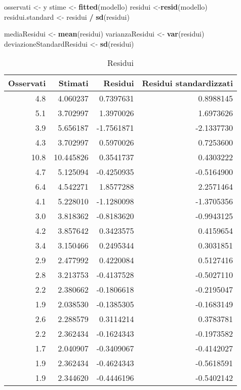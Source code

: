 \documentclass[]{book}
\newenvironment{Shaded}{\begin{snugshade}}{\end{snugshade}}
\newcommand{\KeywordTok}[1]{\textcolor[rgb]{0.13,0.29,0.53}{\textbf{#1}}}
\newcommand{\StringTok}[1]{\textcolor[rgb]{0.31,0.60,0.02}{#1}}
\newcommand{\OperatorTok}[1]{\textcolor[rgb]{0.81,0.36,0.00}{\textbf{#1}}}
\newcommand{\NormalTok}[1]{#1}
\begin{document}
\begin{Shaded}
\begin{Highlighting}[]
\NormalTok{osservati <-}\StringTok{ }\NormalTok{y}
\NormalTok{stime <-}\StringTok{ }\KeywordTok{fitted}\NormalTok{(modello)}
\NormalTok{residui <-}\KeywordTok{resid}\NormalTok{(modello)}
\NormalTok{residui.standard <-}\StringTok{ }\NormalTok{residui }\OperatorTok{/}\StringTok{ }\KeywordTok{sd}\NormalTok{(residui)}

\NormalTok{mediaResidui <-}\StringTok{ }\KeywordTok{mean}\NormalTok{(residui)}
\NormalTok{varianzaResidui <-}\StringTok{ }\KeywordTok{var}\NormalTok{(residui)}
\NormalTok{deviazioneStandardResidui <-}\StringTok{ }\KeywordTok{sd}\NormalTok{(residui)}
\end{Highlighting}
\end{Shaded}

\begin{table}

\caption{\label{tab:modello-polinomiale-residui}Residui}
\centering
\begin{tabular}[t]{r|r|r|r}
\hline
Osservati & Stimati & Residui & Residui standardizzati\\
\hline
4.8 & 4.060237 & 0.7397631 & 0.8988145\\
\hline
5.1 & 3.702997 & 1.3970026 & 1.6973626\\
\hline
3.9 & 5.656187 & -1.7561871 & -2.1337730\\
\hline
4.3 & 3.702997 & 0.5970026 & 0.7253600\\
\hline
10.8 & 10.445826 & 0.3541737 & 0.4303222\\
\hline
4.7 & 5.125094 & -0.4250935 & -0.5164900\\
\hline
6.4 & 4.542271 & 1.8577288 & 2.2571464\\
\hline
4.1 & 5.228010 & -1.1280098 & -1.3705356\\
\hline
3.0 & 3.818362 & -0.8183620 & -0.9943125\\
\hline
4.2 & 3.857642 & 0.3423575 & 0.4159654\\
\hline
3.4 & 3.150466 & 0.2495344 & 0.3031851\\
\hline
2.9 & 2.477992 & 0.4220084 & 0.5127416\\
\hline
2.8 & 3.213753 & -0.4137528 & -0.5027110\\
\hline
2.2 & 2.380662 & -0.1806618 & -0.2195047\\
\hline
1.9 & 2.038530 & -0.1385305 & -0.1683149\\
\hline
2.6 & 2.288579 & 0.3114214 & 0.3783781\\
\hline
2.2 & 2.362434 & -0.1624343 & -0.1973582\\
\hline
1.7 & 2.040907 & -0.3409067 & -0.4142027\\
\hline
1.9 & 2.362434 & -0.4624343 & -0.5618591\\
\hline
1.9 & 2.344620 & -0.4446196 & -0.5402142\\
\hline
\end{tabular}
\end{table}
\end{document}
